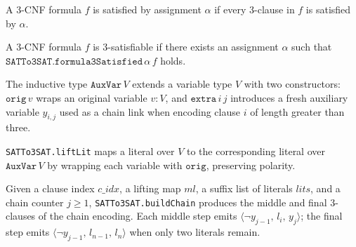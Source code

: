 \begin{definition}
\label{SATTo3SAT.formula3Satisfied}
\leanok
{}
A 3-CNF formula $f$ is satisfied by assignment $\alpha$ if every 3-clause in $f$ is
satisfied by $\alpha$.
\end{definition}

\begin{definition}
\label{SATTo3SAT.is3Satisfiable}
\leanok
{}
A 3-CNF formula $f$ is 3-satisfiable if there exists an assignment $\alpha$ such that
$\texttt{SATTo3SAT.formula3Satisfied}\,\alpha\,f$ holds.
\end{definition}

\begin{definition}
\label{SATTo3SAT.AuxVar}
\leanok
The inductive type $\mathtt{AuxVar}\,V$ extends a variable type $V$ with two constructors:
$\mathtt{orig}\,v$ wraps an original variable $v : V$, and $\mathtt{extra}\,i\,j$
introduces a fresh auxiliary variable $y_{i,j}$ used as a chain link when encoding clause
$i$ of length greater than three.
\end{definition}

\begin{definition}
\label{SATTo3SAT.liftLit}
\leanok
{}
\texttt{SATTo3SAT.liftLit} maps a literal over $V$ to the corresponding literal over
$\mathtt{AuxVar}\,V$ by wrapping each variable with $\mathtt{orig}$, preserving polarity.
\end{definition}

\begin{definition}
\label{SATTo3SAT.buildChain}
\leanok
{}
Given a clause index $c\_idx$, a lifting map $ml$, a suffix list of literals $\mathit{lits}$,
and a chain counter $j \ge 1$, \texttt{SATTo3SAT.buildChain} produces the middle and final
3-clauses of the chain encoding.  Each middle step emits $\langle \lnot y_{j-1},\, l_i,\, y_j\rangle$;
the final step emits $\langle \lnot y_{j-1},\, l_{n-1},\, l_n\rangle$ when only two literals remain.
\end{definition}

